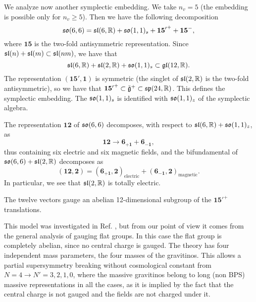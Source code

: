 \documentclass[a4paper,12pt]{article}
\begin{document}
\bigskip


We analyze now another symplectic embedding. We take  $n_v=5$ (the
embedding is possible only for $n_v\geq 5$). Then we have the
following decomposition
 $$\mathfrak{so}(6,6)=
\mathfrak{sl}(6,\mathbb{R})+ \mathfrak{so}(1,1)_s+\mathbf{{15'}^+}+\mathbf{{15}^-}, $$ where
$\mathbf{15}$ is the two-fold antisymmetric representation. Since
$\mathfrak{sl}(n)+\mathfrak{sl}(m)\subset \mathfrak{sl}(nm)$, we have that
$$\mathfrak{sl}(6,\mathbb{R})+\mathfrak{sl}(2,\mathbb{R})+\mathfrak{so}(1,1)_s\subset \mathfrak{gl}(12,\mathbb{R}).$$ The
representation $(\mathbf{15'},\mathbf{1})$ is symmetric (the
singlet of $\mathfrak{sl}(2,\mathbb{R})$ is the two-fold antisymmetric), so we have
that $\mathbf{{15'}^+}\subset\tilde{\mathfrak{g}}^+\subset \mathfrak{sp}(24,\mathbb{R})$. This
defines the symplectic embedding. The $\mathfrak{so}(1,1)_s$ is identified
with $\mathfrak{so}(1,1)_z$ of the symplectic algebra.


 The representation $\mathbf{12}$ of
$\mathfrak{so}(6,6)$ decomposes, with respect to $\mathfrak{sl}(6,\mathbb{R})+\mathfrak{so}(1,1)_z$,
as $$\mathbf{12}\rightarrow \mathbf{6_{+1}}+\mathbf{6_{-1}},$$
thus containing six electric and six magnetic fields, and the
bifundamental of $\mathfrak{so}(6,6)+\mathfrak{sl}(2,\mathbb{R})$ decomposes as
$$\mathbf{(12,2)}=\mathbf{(6_{+1},2)}_{\mathrm{electric}}+\mathbf{(6_{-1},2)}_{\mathrm{magnetic}}.$$
In particular, we see that $\mathfrak{sl}(2,\mathbb{R})$ is totally electric.

The twelve vectors gauge an abelian 12-dimensional subgroup of the
$\mathbf{{15'}^+}$ translations.


This model was investigated in  Ref. \cite{tz}, but from our point
of view  it comes from the general analysis of gauging flat
groups. In this case the flat group is completely abelian, since
no central charge is gauged. The theory has four independent mass
parameters, the four masses of the gravitinos. This allows  a
partial supersymmetry breaking without cosmological constant from
$N=4\rightarrow N'=3,2,1,0$, where the massive gravitinos belong
to long (non BPS) massive representations in all the cases, as it
is implied by the fact that the central charge is not gauged and
the fields are not charged under it.
\end{document}
